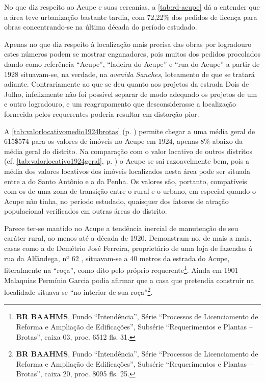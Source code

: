 
No que diz respeito ao Acupe e suas cercanias, a \autoref{tab:rd-acupe} dá a entender que a área teve urbanização bastante tardia, com 72,22\% dos pedidos de licença para obras concentrando-se na última década do período estudado.





Apenas no que diz respeito à localização mais precisa das obras por logradouro estes números podem se mostrar enganadores, pois muitos dos pedidos procolados dando como referência ``Acupe'', ``ladeira do Acupe'' e ``rua do Acupe'' a partir de 1928 situavam-se, na verdade, na \textit{avenida Sanches}, loteamento de que se tratará adiante. Contrariamente ao que se deu quanto aos projetos da estrada Dois de Julho, infelizmente não foi possível separar de modo adequado os projetos de um e outro logradouro, e um reagrupamento que desconsiderasse a localização fornecida pelos requerentes poderia resultar em distorção pior.


A \autoref{tab:valorlocativomedio1924brotas} (p. \pageref{tab:valorlocativomedio1924brotas}) permite chegar a uma média geral de 615\$574 para os valores de imóveis no Acupe em 1924, apenas 8\% abaixo da média geral do distrito. Na comparação com o valor locativo de outros distritos (cf. \autoref{tab:valorlocativo1924geral}, p. \pageref{tab:valorlocativo1924geral}) o Acupe se sai razoavelmente bem, pois a média dos valores locativos dos imóveis localizados nesta área pode ser situada entre a do Santo Antônio e a da Penha. Os valores são, portanto, compatíveis com os de uma zona de transição entre o rural e o urbano, em especial quando o Acupe não tinha, no período estudado, quaisquer dos fatores de atração populacional verificados em outras áreas do distrito.


Parece ter-se mantido no Acupe a tendência inercial de manutenção de seu caráter rural, ao menos até a década de 1920. Demonstram-no, de mais a mais, casas como a de Demétrio José Ferreira, proprietário de uma loja de fazendas à rua da Alfândega, nº 62 \cite[p.~423]{reis_almanak_1898}, situavam-se a 40 metros da estrada do Acupe, literalmente na ``roça'', como dito pelo próprio requerente\footnote{\textbf{BR BAAHMS}, Fundo ``Intendência'', Série ``Processos de Licenciamento de Reforma e Ampliação de Edificações'', Subsérie ``Requerimentos e Plantas -- Brotas'', caixa 03, proc. 6512 fls. 31.}. Ainda em 1901 Malaquias Permínio Garcia podia afirmar que a casa que pretendia construir na localidade situava-se ``no interior de sua roça''\footnote{\textbf{BR BAAHMS}, Fundo ``Intendência'', Série ``Processos de Licenciamento de Reforma e Ampliação de Edificações'', Subsérie ``Requerimentos e Plantas -- Brotas'', caixa 20, proc. 8095 fls. 25.}. 
 

